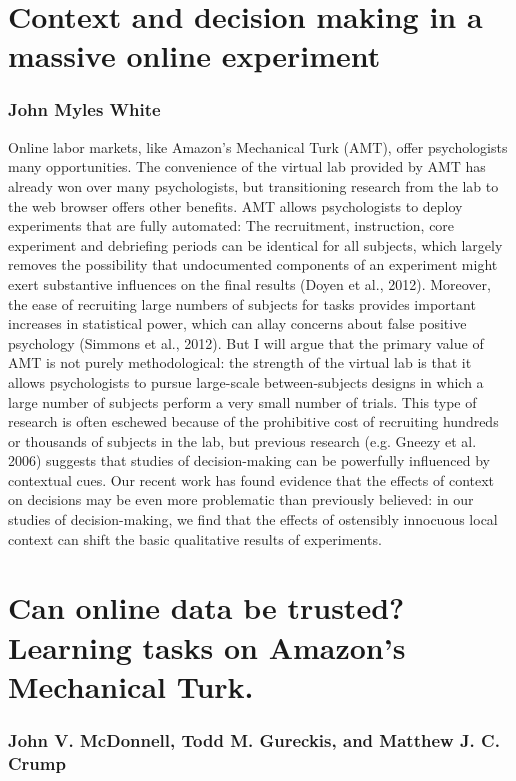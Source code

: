 \documentclass[10pt,letterpaper]{article}
\begin{document}
\section{Context and decision making in a massive online experiment}
\subsubsection{John Myles White}

Online labor markets, like Amazon's Mechanical Turk (AMT), offer psychologists
many opportunities.  The convenience of the virtual lab provided by AMT has
already won over many psychologists, but transitioning research from the lab to
the web browser offers other benefits. AMT allows psychologists to deploy
experiments that are fully automated: The recruitment, instruction, core
experiment and debriefing periods can be identical for all subjects, which
largely removes the possibility that undocumented components of an experiment
might exert substantive influences on the final results (Doyen et al., 2012).
\nocite{Doyen} Moreover, the ease of recruiting large numbers of subjects for
tasks provides important increases in statistical power, which can allay concerns
about false positive psychology (Simmons et al., 2012).  \nocite{Simmons} But I
will argue that the primary value of AMT is not purely methodological: the
strength of the virtual lab is that it allows psychologists to pursue large-scale
between-subjects designs in which a large number of subjects perform a very small
number of trials.  This type of research is often eschewed because of the
prohibitive cost of recruiting hundreds or thousands of subjects in the lab, but
previous research (e.g. Gneezy et al. 2006) \nocite{Gneezy} suggests that studies
of decision-making can be powerfully influenced by contextual cues.  Our recent
work has found evidence that the effects of context on decisions may be even more
problematic than previously believed: in our studies of decision-making, we find
that the effects of ostensibly innocuous local context can shift the basic
qualitative results of experiments.

\section{Can online data be trusted? Learning tasks on Amazon's Mechanical Turk.}
\subsubsection{John V. McDonnell, Todd M. Gureckis, and Matthew J. C. Crump}
\end{document}
